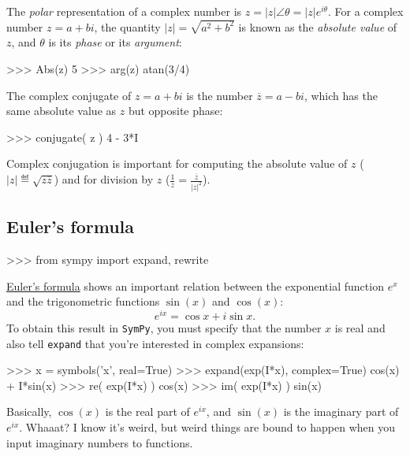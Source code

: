 \noindent
The \emph{polar} representation of a complex number is $z=|z|\angle\theta\! = \!|z|e^{i\theta}$.
For a complex number $z=a+bi$, 
the quantity $|z|=\sqrt{a^2+b^2}$ is known as the \emph{absolute value} of $z$,				
and $\theta$ is its \emph{phase} or its \emph{argument}:

\small
\begin{verbatimtab}
>>> Abs(z)
5
>>> arg(z)
atan(3/4)
\end{verbatimtab}
\normalsize

\noindent
The complex conjugate of $z=a+bi$ is the number $\overline{z} = a-bi$,
which has the same absolute value as $z$ but opposite phase:

\small
\begin{verbatimtab}
>>> conjugate( z )
4 - 3*I
\end{verbatimtab}
\normalsize

\noindent
Complex conjugation is important for computing the absolute value of $z$
($|z|\eqdef\sqrt{ z\overline{z} }$) and for division by $z$ ($\frac{1}{z} = \frac{\overline{z}}{|z|^2}$).

\subsection{Euler's formula}
\label{complex_numbers:euler_s_formula}
\small
\begin{verbatimtab}
>>> from sympy import expand, rewrite
\end{verbatimtab}
\normalsize
\href{https://en.wikipedia.org/wiki/Euler's_formula}{Euler's formula} shows an important relation 
between the exponential function $e^x$ and the trigonometric functions $\sin(x)$ and $\cos(x)$:  
\[
  e^{ix} = \cos x + i \sin x.
\]
To obtain this result in \texttt{SymPy}, you must specify that the number $x$ is real
and also tell \texttt{expand} that you're interested in complex expansions:

\small
\begin{verbatimtab}
>>> x = symbols('x', real=True)
>>> expand(exp(I*x), complex=True)
cos(x) + I*sin(x) 
>>> re( exp(I*x) ) 
cos(x)
>>> im( exp(I*x) ) 
sin(x)
\end{verbatimtab}
\normalsize

\noindent
Basically, $\cos(x)$ is the real part of $e^{ix}$,
and $\sin(x)$ is the imaginary part of $e^{ix}$.
Whaaat? 
I know it's weird,
but weird things are bound to happen when you input imaginary numbers to functions.


